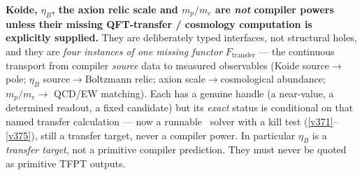 \documentclass[11pt,a4paper]{article}
\begin{document}
\begin{gapbox}
\textbf{Koide, $\eta_B$, the axion relic scale and $m_p/m_e$ are \emph{not} compiler powers unless their
missing QFT-transfer / cosmology computation is explicitly supplied.} They are deliberately typed
interfaces, not structural holes, and they are \emph{four instances of one missing functor}
$F_{\mathrm{transfer}}$ --- the continuous transport from compiler \emph{source} data to measured
observables (Koide source$\to$pole; $\eta_B$ source$\to$Boltzmann relic; axion scale$\to$cosmological
abundance; $m_p/m_e\to$ QCD/EW matching). Each has a genuine handle (a near-value, a determined readout,
a fixed candidate) but its \emph{exact} status is conditional on that named transfer calculation --- now a
runnable \mC\ solver with a kill test (\vref{v371}--\vref{v375}), still a transfer target, never a compiler
power. In particular $\eta_B$ is a \emph{transfer target}, not a primitive compiler prediction.
They must never be quoted as primitive TFPT outputs.


\end{gapbox}
\end{document}
